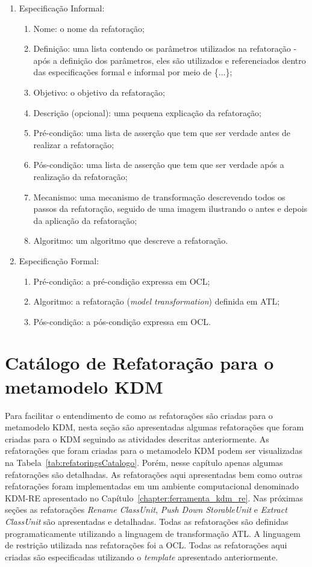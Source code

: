 \begin{enumerate}
	\item Especificação Informal:
		\begin{enumerate}
			\item Nome: o nome da refatoração;
			\item Definição: uma lista contendo os parâmetros utilizados na refatoração - após a definição dos parâmetros, eles são utilizados e referenciados dentro das especificações formal e informal por meio de \{...\};
			\item Objetivo: o objetivo da refatoração;
			\item Descrição (opcional): uma pequena explicação da refatoração;
			\item Pré-condição: uma lista de asserção que tem que ser verdade antes de realizar a refatoração;
			\item Pós-condição: uma lista de asserção que tem que ser verdade após a realização da refatoração;
			\item Mecanismo: uma mecanismo de transformação descrevendo todos os passos da refatoração, seguido de uma imagem ilustrando o antes e depois da aplicação da refatoração;
			\item Algoritmo: um algoritmo que descreve a refatoração.
		\end{enumerate}
	\item Especificação Formal:
		\begin{enumerate}
			\item Pré-condição: a pré-condição expressa em OCL;
			\item Algoritmo: a refatoração (\textit{model transformation}) definida em ATL;
			\item Pós-condição: a pós-condição expressa em OCL.
		\end{enumerate}
\end{enumerate}


\section{Catálogo de Refatoração para o metamodelo KDM}\label{sec:catalogo_refatoracao_kdm}

Para facilitar o entendimento de como as refatorações são criadas para o metamodelo KDM, nesta seção são apresentadas algumas refatorações que foram criadas para o KDM seguindo as atividades descritas anteriormente. As refatorações que foram criadas para o metamodelo KDM podem ser visualizadas na Tabela~\ref{tab:refatoringsCatalogo}. Porém, nesse capítulo apenas algumas refatorações são detalhadas. As refatorações aqui apresentadas bem como outras refatorações foram implementadas em um ambiente computacional denominado KDM-RE apresentado no Capítulo~\ref{chapter:ferramenta_kdm_re}. Nas próximas seções as refatorações \textit{Rename ClassUnit}, \textit{Push Down StorableUnit} e \textit{Extract ClassUnit} são apresentadas e detalhadas. Todas as refatorações são definidas programaticamente utilizando a linguagem de transformação ATL. A linguagem de restrição utilizada nas refatorações foi a OCL. Todas as refatorações aqui criadas são especificadas utilizando o \textit{template} apresentado anteriormente.



